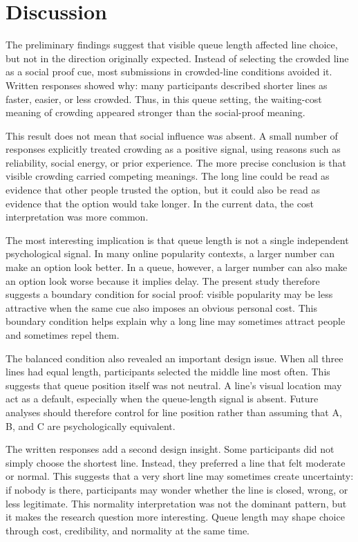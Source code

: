 \documentclass[stu,12pt,floatsintext]{apa7}
\begin{document}
\section{Discussion}

The preliminary findings suggest that visible queue length affected line choice, but not in the direction originally expected. Instead of selecting the crowded line as a social proof cue, most submissions in crowded-line conditions avoided it. Written responses showed why: many participants described shorter lines as faster, easier, or less crowded. Thus, in this queue setting, the waiting-cost meaning of crowding appeared stronger than the social-proof meaning.

This result does not mean that social influence was absent. A small number of responses explicitly treated crowding as a positive signal, using reasons such as reliability, social energy, or prior experience. The more precise conclusion is that visible crowding carried competing meanings. The long line could be read as evidence that other people trusted the option, but it could also be read as evidence that the option would take longer. In the current data, the cost interpretation was more common.

The most interesting implication is that queue length is not a single independent psychological signal. In many online popularity contexts, a larger number can make an option look better. In a queue, however, a larger number can also make an option look worse because it implies delay. The present study therefore suggests a boundary condition for social proof: visible popularity may be less attractive when the same cue also imposes an obvious personal cost. This boundary condition helps explain why a long line may sometimes attract people and sometimes repel them.

The balanced condition also revealed an important design issue. When all three lines had equal length, participants selected the middle line most often. This suggests that queue position itself was not neutral. A line's visual location may act as a default, especially when the queue-length signal is absent. Future analyses should therefore control for line position rather than assuming that A, B, and C are psychologically equivalent.

The written responses add a second design insight. Some participants did not simply choose the shortest line. Instead, they preferred a line that felt moderate or normal. This suggests that a very short line may sometimes create uncertainty: if nobody is there, participants may wonder whether the line is closed, wrong, or less legitimate. This normality interpretation was not the dominant pattern, but it makes the research question more interesting. Queue length may shape choice through cost, credibility, and normality at the same time.
\end{document}
